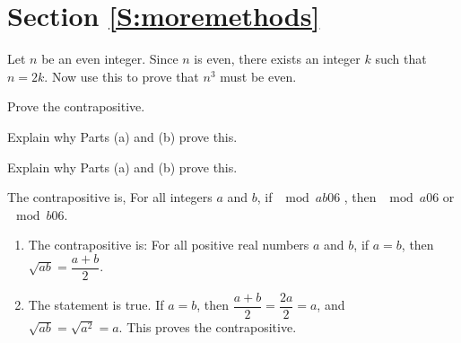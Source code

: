 \section*{Section \ref{S:moremethods}}
\renewcommand{\labelenumi}{(\textbf{\alph{enumi}})}

\begin{list}{\bf{\ref{exer:ncubed}.}}
\item \begin{list}{\bf{(a)}}
\item Let  $n$  be an even integer.  Since  $n$  is even, there exists an integer  $k$ such that
$n = 2k$. Now use this to prove that $n^3$   must be even.
\end{list}
\end{list}
%
\begin{list}{}
\item \begin{list}{\bf{(b)}}
\item Prove the contrapositive.
\end{list}
\end{list}
%
\begin{list}{}
\item \begin{list}{\bf{(c)}}
\item Explain why Parts (a) and (b) prove this.
\end{list}
\end{list}
%
\begin{list}{}
\item \begin{list}{\bf{(d)}}
\item Explain why Parts (a) and (b) prove this.
\end{list}
\end{list}

\vskip9pt
\begin{list}{\bf{\ref{exer:sec32-2}.}}
\item \begin{list}{\bf{(a)}}
\item The contrapositive is,  For all integers $a$  and  $b$, if  $\mod{ab}{0}{6}$
, then  $\mod{a}{0}{6}$  or   $\mod{b}{0}{6}$.
\end{list}
\end{list}

\begin{list}{\bf{3}.}
\item \begin{enumerate}
\item The contrapositive is:  For all positive real numbers $a$ and $b$,  if $a = b$, then 
$\sqrt{ab} = \dfrac{a + b}{2}$.

\item The statement is true.  If $a = b$, then $\dfrac{a + b}{2} = \dfrac{2a}{2} = a$, and \\
$\sqrt{ab} = \sqrt{a^2} = a$.  This proves the contrapositive.
\end{enumerate}
\end{list}


